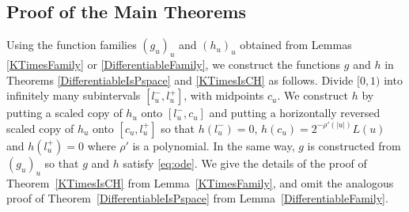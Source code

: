 \subsection{Proof of the Main Theorems}
\label{subsection: proof of theorems}
Using the function families $(g_u)_u$ and $(h_u)_u$ 
obtained from Lemmas \ref{KTimesFamily} or \ref{DifferentiableFamily}, 
we construct the functions $g$ and $h$ in 
Theorems \ref{DifferentiableIsPspace} and \ref{KTimesIsCH} as follows. 
Divide $[0,1)$ into infinitely many subintervals $[l^-_u, l^+_u]$,
with midpoints $c_u$.
We construct $h$ by putting a scaled copy of $h_u$ onto $[l^-_u, c_u]$ and
putting a horizontally reversed scaled copy of $h_u$ onto $[c_u, l^+_u]$ 
so that $h(l^-_u) = 0$, $h(c_u) = 2^{-\rho'(|u|)} L(u)$ and $h(l^+_u) = 0$ where $\rho'$ is a polynomial.
In the same way, $g$ is constructed from $(g_u)_u$ so that $g$ and $h$ satisfy \eqref{eq:ode}.
We give the details of the proof of 
Theorem~\ref{KTimesIsCH} from Lemma~\ref{KTimesFamily}, 
and omit the analogous proof of Theorem~\ref{DifferentiableIsPspace} 
from Lemma~\ref{DifferentiableFamily}. 


